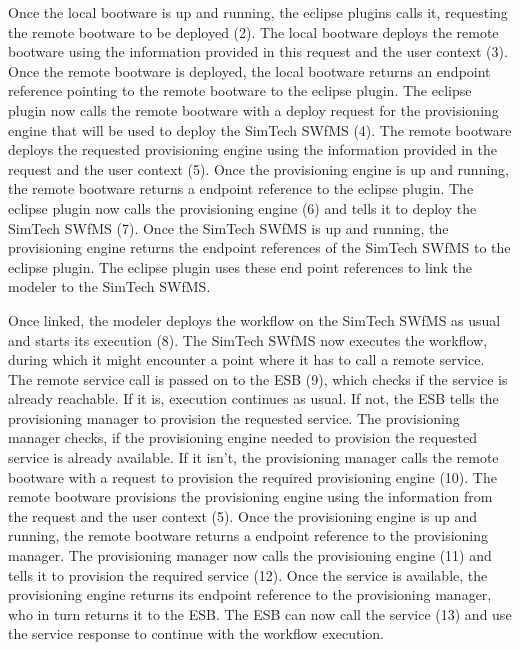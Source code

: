 Once the local bootware is up and running, the eclipse plugins calls it, requesting the remote bootware to be deployed (2).
The local bootware deploys the remote bootware using the information provided in this request and the user context (3).
Once the remote bootware is deployed, the local bootware returns an endpoint reference pointing to the remote bootware to the eclipse plugin.
The eclipse plugin now calls the remote bootware with a deploy request for the provisioning engine that will be used to deploy the SimTech SWfMS (4).
The remote bootware deploys the requested provisioning engine using the information provided in the request and the user context (5).
Once the provisioning engine is up and running, the remote bootware returns a endpoint reference to the eclipse plugin.
The eclipse plugin now calls the provisioning engine (6) and tells it to deploy the SimTech SWfMS (7).
Once the SimTech SWfMS is up and running, the provisioning engine returns the endpoint references of the SimTech SWfMS to the eclipse plugin.
The eclipse plugin uses these end point references to link the modeler to the SimTech SWfMS.

Once linked, the modeler deploys the workflow on the SimTech SWfMS as usual and starts its execution (8).
The SimTech SWfMS now executes the workflow, during which it might encounter a point where it has to call a remote service.
The remote service call is passed on to the ESB (9), which checks if the service is already reachable.
If it is, execution continues as usual.
If not, the ESB tells the provisioning manager to provision the requested service.
The provisioning manager checks, if the provisioning engine needed to provision the requested service is already available.
If it isn't, the provisioning manager calls the remote bootware with a request to provision the required provisioning engine (10).
The remote bootware provisions the provisioning engine using the information from the request and the user context (5).
Once the provisioning engine is up and running, the remote bootware returns a endpoint reference to the provisioning manager.
The provisioning manager now calls the provisioning engine (11) and tells it to provision the required service (12).
Once the service is available, the provisioning engine returns its endpoint reference to the provisioning manager, who in turn returns it to the ESB.
The ESB can now call the service (13) and use the service response to continue with the workflow execution.

